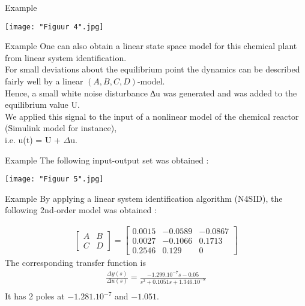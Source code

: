 \begin{frame}{Example}
\begin{center}
\texttt{[image: "Figuur 4".jpg]}
\end{center}
\end{frame}

\begin{frame}{Example}
One can also obtain a linear state space model for this
chemical plant from linear system identification.\\
For small deviations about the equilibrium point the dynamics can be described fairly well by a linear $(A, B,C, D)$-model. \\
\vspace{0.3cm}
Hence, a small white noise disturbance ∆u was
generated and was added to the equilibrium value U. \\
We applied this signal to the input of a nonlinear model of the chemical reactor (Simulink model for instance),\\ i.e. u(t) = U + $\Delta$u.
\end{frame}

\begin{frame}{Example}
The following input-output set was obtained :
\begin{center}
\texttt{[image: "Figuur 5".jpg]}
\end{center}
\end{frame}

\begin{frame}{Example}
By applying a linear system identification algorithm
(N4SID), the following 2nd-order model was obtained :

\begin{align*}
{
\left[
    \begin{array}{c|c}
        A & B \\ \hline
        C & D
    \end{array}
\right]
=
\left[
\begin{array}{cc|c}
0.0015 & −0.0589 &−0.0867\\ 
0.0027 & −0.1066 &0.1713\\ \hline
0.2546 &  0.129  & 0
\end{array}\right]
}
\end{align*}
The corresponding transfer function is
\begin{align*}
\frac{\Delta y(s)}{\Delta u(s)} = \frac{-1.299.10^{-7}s-0.05}{s^2+0.1051s+1.346.10^{-8}}\\
\end{align*}
\vspace{0.5cm}
It has 2 poles at $−1.281.10^{−7}$
and $−1.051$.
\end{frame}

